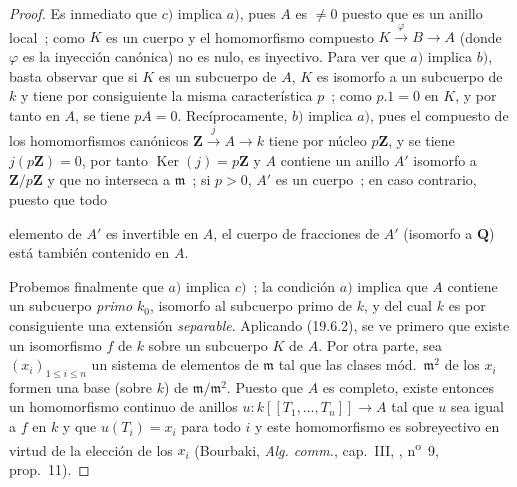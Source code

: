 \begin{proof}
Es inmediato que $c)$ implica $a)$, pues $A$ es $\neq0$ puesto que es un
anillo local~; como $K$ es un cuerpo y el homomorfismo compuesto
$K\xrightarrow{\varphi}B\to A$ (donde $\varphi$ es la inyección canónica) no es
nulo, es inyectivo. Para ver que $a)$ implica $b)$, basta
observar que si $K$ es un subcuerpo de $A$, $K$ es isomorfo a un
subcuerpo de $k$ y tiene por consiguiente la misma característica $p$~; como $p.1=0$ en
$K$, y por tanto en $A$, se tiene $pA=0$. Recíprocamente, $b)$ implica $a)$, pues el
compuesto de los homomorfismos canónicos
$\mathbf Z\xrightarrow{j}A\to k$ tiene por núcleo $p\mathbf Z$, y se tiene
$j(p\mathbf Z)=0$, por tanto $\operatorname{Ker}(j)=p\mathbf Z$ y $A$ contiene un
anillo $A'$ isomorfo a $\mathbf Z/p\mathbf Z$ y que no interseca a
$\mathfrak m$~; si $p>0$, $A'$ es un cuerpo~; en caso contrario, puesto que todo


elemento de $A'$ es invertible en $A$, el cuerpo de fracciones de $A'$
(isomorfo a $\mathbf Q$) está también contenido en $A$.

Probemos finalmente que $a)$ implica $c)$~; la condición $a)$ implica que $A$
contiene un subcuerpo \emph{primo} $k_0$, isomorfo al subcuerpo primo de $k$,
y del cual $k$ es por consiguiente una extensión \emph{separable}. Aplicando (19.6.2), se ve
primero que existe un isomorfismo $f$ de $k$ sobre un subcuerpo $K$ de $A$.
Por otra parte, sea $(x_i)_{1\leq i\leq n}$ un sistema de elementos de
$\mathfrak m$ tal que las clases mód.~$\mathfrak m^2$ de los $x_i$ formen una
base (sobre $k$) de $\mathfrak m/\mathfrak m^2$. Puesto que $A$ es completo, existe
entonces un homomorfismo continuo de anillos
$u:k[[T_1,\ldots,T_n]]\to A$ tal que $u$ sea igual a $f$ en $k$ y que
$u(T_i)=x_i$ para todo $i$ y este homomorfismo es sobreyectivo en virtud de la
elección de los $x_i$ (Bourbaki, \emph{Alg. comm.}, cap.~III, ,
n\textsuperscript{o}~9, prop.~11).
\end{proof}

